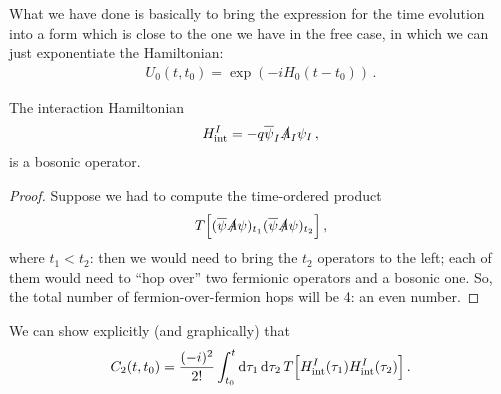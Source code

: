 \documentclass[main.tex]{subfiles}
\begin{document}
What we have done is basically to bring the expression for the time evolution into a form which is close to the one we have in the free case, in which we can just exponentiate the Hamiltonian: 
%
\begin{align}
U_0 (t, t_0 ) = \exp( - i H_0 (t - t_0 ))
\,.
\end{align}

\begin{claim}
The interaction Hamiltonian 
%
\begin{align}
H _{\text{int}}^{I} = - q \overline{\psi}_{I} \slashed{A}_{I} \psi_{I}
\,,
\end{align}
%
is a bosonic operator. 
\end{claim}

\begin{proof}
Suppose we had to compute the time-ordered product 
%
\begin{align}
T \qty[
(\overline{\psi}\slashed{A} \psi )_{t_1 }
(\overline{\psi}\slashed{A} \psi )_{t_2 }
]
\,,
\end{align}
%
where \(t_1 < t_2\): then we would need to bring the \(t_2 \) operators to the left; each of them would need to ``hop over'' two fermionic operators and a bosonic one. So, the total number of fermion-over-fermion hops will be 4: an even number.
\end{proof}


We can show explicitly (and graphically) that 
%
\begin{align}
C_2 (t, t_0 ) = \frac{(-i)^2}{2!} 
\int_{t_0 }^{t} \dd{\tau_1} \dd{\tau_2 } T \qty[H _{\text{int}}^{I}(\tau_1 ) H _{\text{int}}^{I} (\tau_2 )]
\,.
\end{align}
\end{document}
